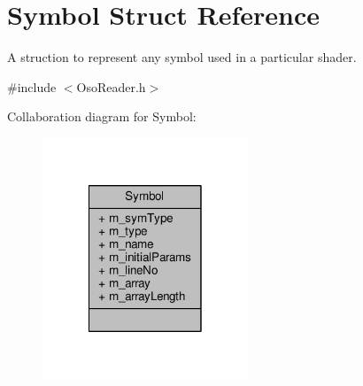 \hypertarget{struct_symbol}{\section{Symbol Struct Reference}
\label{struct_symbol}
}


A struction to represent any symbol used in a particular shader.  




{\ttfamily \#include $<$Oso\-Reader.\-h$>$}



Collaboration diagram for Symbol\-:
\nopagebreak
\begin{figure}[H]
\begin{center}
\leavevmode
\includegraphics[width=174pt]{struct_symbol__coll__graph}
\end{center}
\end{figure}
